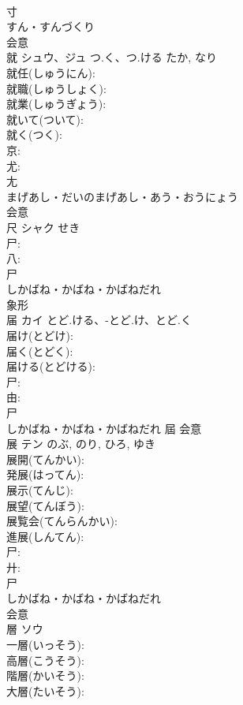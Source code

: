 \documentclass[8pt]{extreport}
\begin{document}
\begin{CJK}{UTF8}{min}
\\	寸	
\\	すん・すんづくり	
\\	会意 
\\	就	シュウ、ジュ	つ.く、つ.ける	たか, なり	
\\	就任(しゅうにん): 
\\	就職(しゅうしょく): 
\\	就業(しゅうぎょう): 
\\	就いて(ついて): 
\\	就く(つく): 
\\	京: 
\\	尤: 
\\	尢	
\\	まげあし・だいのまげあし・あう・おうにょう	
\\	会意 
\\	尺	シャク		せき	
\\	尸: 
\\	八: 
\\	尸	
\\	しかばね・かばね・かばねだれ	
\\	象形 
\\	届	カイ	とど.ける、-とど.け、とど.く		
\\	届け(とどけ): 
\\	届く(とどく): 
\\	届ける(とどける): 
\\	尸: 
\\	由: 
\\	尸	
\\	しかばね・かばね・かばねだれ	屆	会意 
\\	展	テン		のぶ, のり, ひろ, ゆき	
\\	展開(てんかい): 
\\	発展(はってん): 
\\	展示(てんじ): 
\\	展望(てんぼう): 
\\	展覧会(てんらんかい): 
\\	進展(しんてん): 
\\	尸: 
\\	廾: 
\\	尸	
\\	しかばね・かばね・かばねだれ	
\\	会意 
\\	層	ソウ			
\\	一層(いっそう): 
\\	高層(こうそう): 
\\	階層(かいそう): 
\\	大層(たいそう): 

\end{CJK}
\end{document}
